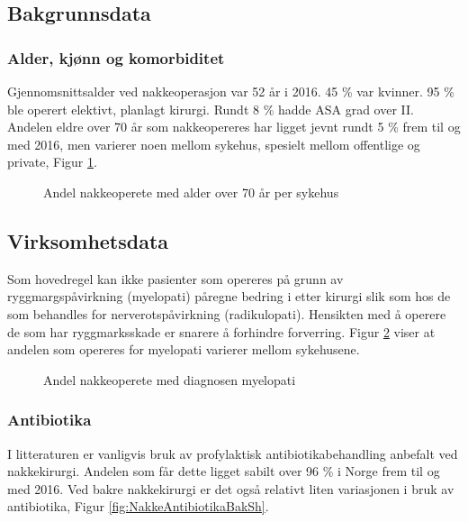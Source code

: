 \subsection{Bakgrunnsdata}
\subsubsection{Alder, kjønn og komorbiditet}
Gjennomsnittsalder ved nakkeoperasjon var 52 år i 2016. 45 \% var kvinner. 95 \% ble operert elektivt, planlagt kirurgi. Rundt  8 \% hadde ASA grad over II. Andelen eldre over 70 år som nakkeopereres har ligget jevnt rundt 5 \% frem til og med 2016, men varierer noen mellom sykehus, spesielt mellom offentlige og private, Figur \ref{fig:NakkeAlder70}.


\begin{figure}[ht]
\caption{\label{fig:NakkeAlder70} Andel nakkeoperete med alder over 70 år per sykehus}
\end{figure}

\subsection{Virksomhetsdata}

Som hovedregel kan ikke pasienter som opereres på grunn av ryggmargspåvirkning (myelopati) påregne bedring i etter kirurgi slik som hos de som behandles for nerverotspåvirkning (radikulopati). Hensikten med å operere de som har ryggmarksskade er snarere å forhindre forverring. Figur \ref{fig:NakkeMyelopatiSh} viser at andelen som opereres for myelopati varierer mellom sykehusene.

\begin{figure}[ht]
\caption{\label{fig:NakkeMyelopatiSh} Andel nakkeoperete med diagnosen myelopati}
\end{figure}

\subsubsection{Antibiotika}

I litteraturen er vanligvis bruk av profylaktisk antibiotikabehandling  anbefalt ved nakkekirurgi. Andelen som får dette ligget sabilt over 96 \% i Norge frem til og med 2016. Ved bakre nakkekirurgi er det også relativt liten variasjonen i bruk av antibiotika, Figur \ref{fig:NakkeAntibiotikaBakSh}. 

